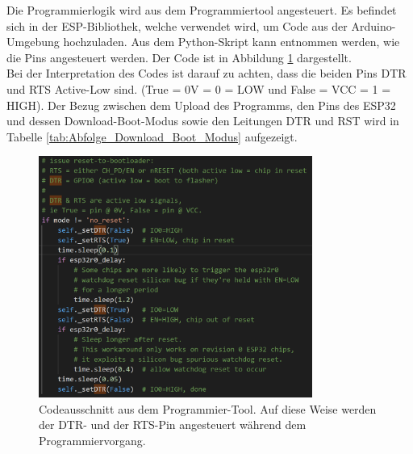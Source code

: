 Die Programmierlogik wird aus dem Programmiertool angesteuert. Es befindet sich in der ESP-Bibliothek, welche verwendet wird, um Code aus der Arduino-Umgebung hochzuladen. Aus dem Python-Skript kann entnommen werden, wie die Pins angesteuert werden. Der Code ist in Abbildung \ref{fig:ESP32_Boot_Code} dargestellt.\\
Bei der Interpretation des Codes ist darauf zu achten, dass die beiden Pins DTR und RTS Active-Low sind. (True = 0V = 0 = LOW und False = VCC = 1 = HIGH). Der Bezug zwischen dem Upload des Programms, den Pins des ESP32 und dessen Download-Boot-Modus sowie den Leitungen DTR und RST wird in Tabelle \ref{tab:Abfolge_Download_Boot_Modus} aufgezeigt.

\begin{figure}[H]
	\centering
	\includegraphics[width=0.8\textwidth]{graphics/ESP32_Boot_Code}
	\caption{Codeausschnitt aus dem Programmier-Tool. Auf diese Weise werden der DTR- und der RTS-Pin angesteuert während dem Programmiervorgang.}
	\label{fig:ESP32_Boot_Code}
\end{figure}

